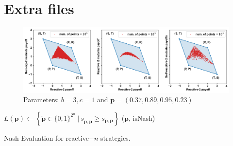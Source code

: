 \documentclass{article}
\begin{document}
\section{Extra files}

\begin{figure}[htbp]
    \centering
    \includegraphics[width=\textwidth]{figures/sufficiency_of_self_reactive_numerical_example_n_2.pdf}
    \caption{Parameters: $b=3, c=1$ and $\mathbf{p}=(0.37, 0.89, 0.95, 0.23)$}
    \label{fig:enter-label}
\end{figure}


\begin{algorithm}[H]
   $L(\mathbf{p}) \gets \left\{\mathbf{\tilde{p}} \in \{0, 1\}^{2 ^ n} ~\big|~ 
   s_{\mathbf{\tilde{p},\mathbf{p}}} \geq s_{\mathbf{p}, \mathbf{p}} \right\}$\;
  \Return (\(\mathbf{p}\), isNash) \;
  \caption{Nash Evaluation for reactive$-n$ strategies.}
\end{algorithm}
\end{document}
